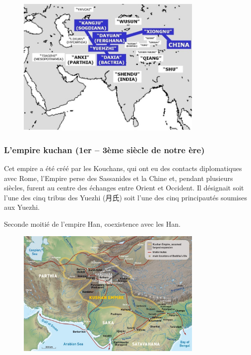 \begin{figure}[!h]
    \centering
    \includegraphics[width=0.8\textwidth]{ConfucianismeTaoismeBouddhismeChinois/Images/PaysZhan.jpg}

    \label{fig:enter-label}
\end{figure}

 \subsubsection{L’empire kuchan (1er – 3ème siècle de notre ère)}
\label{sec:Kuchan}
Cet empire a été créé par les Kouchans, qui ont eu des contacts diplomatiques avec Rome, l’Empire perse des Sassanides et la Chine et, pendant plusieurs siècles, furent au centre des échanges entre Orient et Occident. Il désignait soit l’une des cinq tribus des Yuezhi (月氏) soit l'une des cinq principautés soumises aux Yuezhi.

Seconde moitié de l'empire Han, coexistence avec les Han. 
\begin{figure}[!h]
    \centering
    \includegraphics[width=0.8\textwidth]{ConfucianismeTaoismeBouddhismeChinois/Images/KushEmpire.jpg}

    \label{fig:enter-label}
\end{figure}

